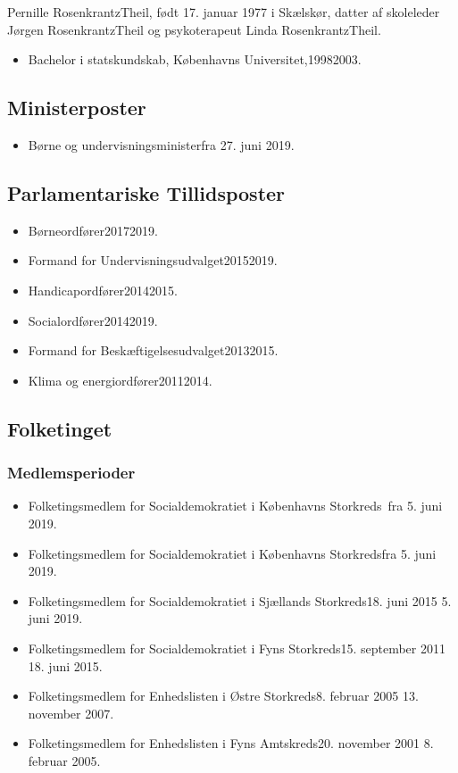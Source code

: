 \documentclass[11pt, a4paper]{awesome-cv}
\begin{document}
\makecvheader[R]
\makelettertitle
\begin{cvletter}
Pernille RosenkrantzTheil, født 17. januar 1977 i Skælskør, datter af skoleleder Jørgen RosenkrantzTheil og psykoterapeut Linda RosenkrantzTheil.

\begin{itemize}
\item Bachelor i statskundskab, Københavns Universitet,19982003.
\end{itemize}
\subsection*{Ministerposter}
\begin{itemize}
\item Børne og undervisningsministerfra 27. juni 2019.
\end{itemize}
\subsection*{Parlamentariske Tillidsposter}
\begin{itemize}
\item Børneordfører20172019.
\item Formand for Undervisningsudvalget20152019.
\item Handicapordfører20142015.
\item Socialordfører20142019.
\item Formand for Beskæftigelsesudvalget20132015.
\item Klima og energiordfører20112014.
\end{itemize}
\subsection*{Folketinget}
\subsubsection*{Medlemsperioder}
\begin{itemize}
\item Folketingsmedlem for Socialdemokratiet i Københavns Storkreds fra 5. juni 2019.
\item Folketingsmedlem for Socialdemokratiet i Københavns Storkredsfra 5. juni 2019.
\item Folketingsmedlem for Socialdemokratiet i Sjællands Storkreds18. juni 2015  5. juni 2019.
\item Folketingsmedlem for Socialdemokratiet i Fyns Storkreds15. september 2011  18. juni 2015.
\item Folketingsmedlem for Enhedslisten i Østre Storkreds8. februar 2005  13. november 2007.
\item Folketingsmedlem for Enhedslisten i Fyns Amtskreds20. november 2001  8. februar 2005.
\end{itemize}

\end{cvletter}
\end{document}
